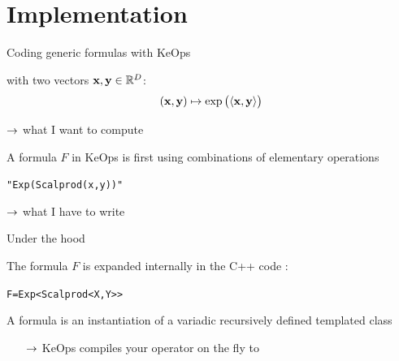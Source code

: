 \documentclass[14pt]{beamer}
\begin{document}
\section{Implementation}

\begin{frame}{Coding generic formulas with KeOps}

\btVFill

\hypertarget{implementation}{}

 with two vectors $\mathbf{x},\mathbf{y}\in\mathbb{R}^D$:
\[
(\mathbf{x}, \mathbf{y}) \mapsto \exp\big(\langle \mathbf{x}, \mathbf{y}\rangle\big)
\]

\begin{center}
\small
$\rightarrow$ what I want to compute
\end{center}\bigskip

A formula $F$ in KeOps is first  using combinations of elementary operations
\begin{center}
\texttt{"Exp(Scalprod(x,y))"}
\end{center}

\begin{center}
\small
$\rightarrow$ what I have to write
\end{center}

\end{frame}


\begin{frame}{Under the hood}

The formula $F$ is expanded internally in the C++ code :
\begin{center}
\texttt{F=Exp<Scalprod<X,Y>{}>}
\end{center}
\bigskip

A formula is an instantiation of a variadic recursively defined templated class\medskip

\begin{itemize}
\item[$\rightarrow$] KeOps compiles your operator on the fly to 
\end{itemize}

\end{frame}
\end{document}
